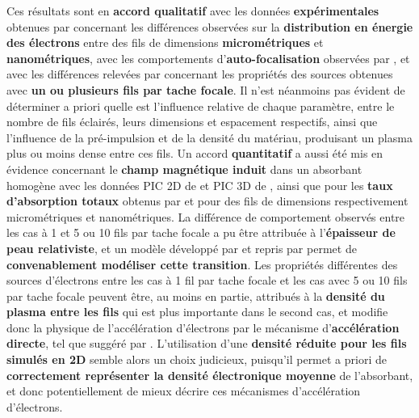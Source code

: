 \begin{refsection}
Ces résultats sont en \textbf{accord qualitatif} avec les données \textbf{expérimentales} obtenues par \cite{cristoforetti_2017} concernant les différences observées sur la \textbf{distribution en énergie des électrons} entre des fils de dimensions \textbf{micrométriques} et \textbf{nanométriques}, avec les comportements d'\textbf{auto-focalisation} observées par \cite{bin_2015}, et avec les différences relevées par \cite{dozieres_2019} concernant les propriétés des sources obtenues avec \textbf{un ou plusieurs fils par tache focale}. Il n'est néanmoins pas évident de déterminer a priori quelle est l'influence relative de chaque paramètre, entre le nombre de fils éclairés, leurs dimensions et espacement respectifs, ainsi que l'influence de la pré-impulsion et de la densité du matériau, produisant un plasma plus ou moins dense entre ces fils. Un accord \textbf{quantitatif} a aussi été mis en évidence concernant le \textbf{champ magnétique induit} dans un absorbant homogène avec les données PIC 2D de \cite{pazzaglia_2020} et PIC 3D de \cite{pukhov_1996}, ainsi que pour les \textbf{taux d'absorption totaux} obtenus par \cite{jiang_2014} et \cite{fedeli_2018c} pour des fils de dimensions respectivement micrométriques et nanométriques. La différence de comportement observés entre les cas à 1 et 5 ou 10 fils par tache focale a pu être attribuée à l'\textbf{épaisseur de peau relativiste}, et un modèle développé par \cite{vshivkov_1998b} et repris par \cite{lecz_2018} permet de \textbf{convenablement modéliser cette transition}. Les propriétés différentes des sources d'électrons entre les cas à 1 fil par tache focale et les cas avec 5 ou 10 fils par tache focale peuvent être, au moins en partie, attribués à la \textbf{densité du plasma entre les fils} qui est plus importante dans le second cas, et modifie donc la physique de l'accélération d'électrons par le mécanisme d'\textbf{accélération directe}, tel que suggéré par \cite{jiang_2014}. L'utilisation d'une \textbf{densité réduite pour les fils simulés en 2D} semble alors un choix judicieux, puisqu'il permet a priori de \textbf{correctement représenter la densité électronique moyenne} de l'absorbant, et donc potentiellement de mieux décrire ces mécanismes d'accélération d'électrons.


\end{refsection}
